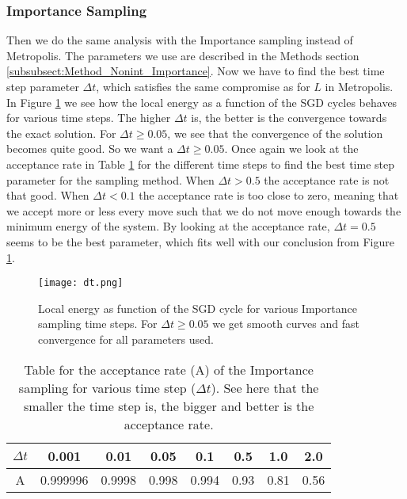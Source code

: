\documentclass[12pt,a4paper,english]{article}
\begin{document}
\subsubsection{Importance Sampling}
\label{subsubsect:Results_nonint_Importance}
Then we do the same analysis with the Importance sampling instead of Metropolis. The parameters we use are described in the Methods section \ref{subsubsect:Method_Nonint_Importance}. Now we have to find the best time step parameter $\Delta t$, which satisfies the same compromise as for $L$ in Metropolis. In Figure \ref{fig:check_dt} we see how the local energy as a function of the SGD cycles behaves for various time steps. The higher $\Delta t$ is, the better is the convergence towards the exact solution. For $\Delta t\geq 0.05$, we see that the convergence of the solution becomes quite good. So we want a $\Delta t\geq0.05$. Once again we look at the acceptance rate in Table \ref{tab:Imp_A} for the different time steps to find the best time step parameter for the sampling method. When $\Delta t>0.5$ the acceptance rate is not that good. When $\Delta t<0.1$ the acceptance rate is too close to zero, meaning that we accept more or less every move such that we do not move enough towards the minimum energy of the system. By looking at the acceptance rate, $\Delta t=0.5$ seems to be the best parameter, which fits well with our conclusion from Figure \ref{fig:check_dt}.

\begin{figure}[htbp!]
	\centering\texttt{[image: dt.png]}
	\caption{Local energy as function of the SGD cycle for various Importance sampling time steps. For $\Delta t\geq0.05$ we get smooth curves and fast convergence for all parameters used. \label{fig:check_dt}}
\end{figure}

\begin{table}[htbp!]
	\centering
	\begin{tabular}{|c|c|c|c|c|c|c|c|}
		\hline \rule{0pt}{13pt}
		$\Delta t$ & 0.001 & 0.01 & 0.05 & 0.1 & 0.5 & 1.0 & 2.0 \\
		\hline \rule{0pt}{13pt}
		A & 0.999996 & 0.9998 & 0.998 & 0.994 & 0.93 & 0.81 & 0.56 \\
		\hline
	\end{tabular}
	\caption{Table for the acceptance rate (A) of the Importance sampling for various time step ($\Delta t$). See here that the smaller the time step is, the bigger and better is the acceptance rate. \label{tab:Imp_A}}
\end{table}
\end{document}
